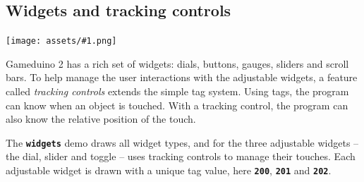 \documentclass[10pt]{book}
\newcommand{\gdtwo}{Gameduino 2 }
\newcommand{\png}[1]{
\begin{center}
\texttt{[image: assets/\#1.png]}
\end{center}
}
\newcommand{\mach}[1]{\texttt{\textbf{#1}}}
\begin{document}
\begin{CJK}{UTF8}{gkai}
\section{Widgets and tracking controls}
\label{widgets}

\png{widgets3d}

\gdtwo has a rich set of widgets: dials, buttons, gauges, sliders and scroll bars.
To help manage the user interactions with the adjustable widgets, a feature called \textit{tracking controls}
extends the simple tag system.
Using tags, the program can know when an object is touched.
With a tracking control, the program can also know the relative position of the touch.

The \mach{widgets} demo draws all widget types, and
for the three adjustable widgets -- the dial, slider and toggle -- uses tracking controls to manage their touches.
Each adjustable widget is drawn with a unique tag value, here
\mach{200},
\mach{201} and
\mach{202}.

\vspace{10pt}

\end{CJK}
\end{document}
